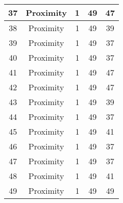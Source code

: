 \documentclass[results.tex]{subfiles}
\begin{document}
\begin{center}
\begin{tabular}{| c || c | c | c | c |}
            \hline
            37                      & Proximity                    & 1                      & 49                      & 47                   \\
            \hline
            38                      & Proximity                    & 1                      & 49                      & 39                   \\
            \hline
            39                      & Proximity                    & 1                      & 49                      & 37                   \\
            \hline
            40                      & Proximity                    & 1                      & 49                      & 37                   \\
            \hline
            41                      & Proximity                    & 1                      & 49                      & 47                   \\
            \hline
            42                      & Proximity                    & 1                      & 49                      & 47                   \\
            \hline
            43                      & Proximity                    & 1                      & 49                      & 39                   \\
            \hline
            44                      & Proximity                    & 1                      & 49                      & 37                   \\
            \hline
            45                      & Proximity                    & 1                      & 49                      & 41                   \\
            \hline
            46                      & Proximity                    & 1                      & 49                      & 37                   \\
            \hline
            47                      & Proximity                    & 1                      & 49                      & 37                   \\
            \hline
            48                      & Proximity                    & 1                      & 49                      & 41                   \\
            \hline
            49                      & Proximity                    & 1                      & 49                      & 49                   \\
            \hline
        \end{tabular}
    \end{center}
\end{document}
